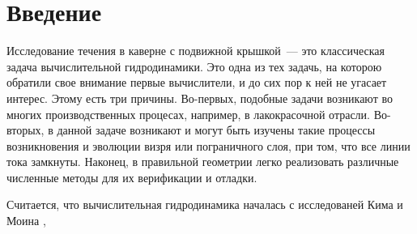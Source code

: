 \section*{Введение \cite{introduction}}

Исследование течения в каверне с подвижной крышкой~--- это классическая задача вычислительной гидродинамики. Это одна из тех задачь, на которою обратили свое внимание первые вычислители, и до сих пор к ней не угасает интерес. Этому есть три причины. Во-первых, подобные задачи возникают во многих производственных процесах, например, в лакокрасочной отрасли. Во-вторых, в данной задаче возникают и могут быть изучены такие процессы возникновения и эволюции визря или пограничного слоя, при том, что все линии тока замкнуты. Наконец, в правильной геометрии легко реализовать различные численные методы для их верификации и отладки.

Считается, что вычислительная гидродинамика началась с исследованей Кима и Моина \cite{KimMoin}, 
 
\newpage
